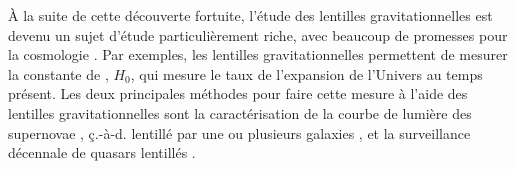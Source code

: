 À la suite de cette découverte fortuite, l'étude des lentilles gravitationnelles est devenu un sujet d'étude 
particulièrement riche, avec beaucoup de promesses pour la cosmologie \citep{Blandford1992,Bartelmann2010,Treu2010}. 
Par exemples, les lentilles gravitationnelles permettent de mesurer 
la constante de \citet{Hubble1929}, $H_0$, qui mesure le taux de l'expansion de l'Univers au temps présent. Les deux principales méthodes 
pour faire cette mesure à l'aide des lentilles gravitationnelles sont la caractérisation de la courbe de lumière des supernovae \citet{Refsdal1964}, 
ç.-à-d. lentillé par une ou plusieurs galaxies \citep[e.g.][]{Kelly2015,Goobar2017}, et la surveillance décennale de quasars lentillés 
\citep[e.g.][]{Vanderriest1989,Wong2020}. 

